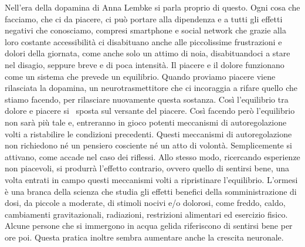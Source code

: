 \documentclass[12pt]{book} %
\begin{document}
\begin{mdframed}[linewidth=1pt]
Nell'era della dopamina di Anna Lembke si parla proprio di questo. Ogni
cosa che facciamo, che ci da piacere, ci può portare alla dipendenza e a tutti gli effetti negativi che conosciamo,
compresi smartphone e social network che grazie alla loro costante accessibilità ci disabituano anche alle piccolissime
frustrazioni e dolori della giornata, come anche solo un attimo di noia, disabituandoci a stare nel disagio, seppure
breve e di poca intensità. Il piacere e il dolore funzionano come un sistema che prevede un equilibrio. Quando proviamo
piacere viene rilasciata la dopamina, un neurotrasmettitore che ci incoraggia a rifare quello che stiamo facendo, per
rilasciare nuovamente questa sostanza. Così l'equilibrio tra dolore e piacere si \ sposta sul
versante del piacere. Così facendo però l'equilibrio non sarà più tale e, entreranno in gioco
potenti meccanismi di autoregolazione volti a ristabilire le condizioni precedenti. Questi meccanismi di
autoregolazione non richiedono né un pensiero cosciente né un atto di volontà. Semplicemente si attivano, come accade
nel caso dei riflessi. Allo stesso modo, ricercando esperienze non piacevoli, si produrrà l'effetto contrario, ovvero
quello di sentirsi bene, una volta entrati in campo questi meccanismi volti a ripristinare
l'equilibrio. L'ormesi è una branca della scienza che studia gli effetti
benefici della somministrazione di dosi, da piccole a moderate, di stimoli nocivi e/o dolorosi, come freddo, caldo,
cambiamenti gravitazionali, radiazioni, restrizioni alimentari ed esercizio fisico. Alcune persone che si immergono in
acqua gelida riferiscono di sentirsi bene per ore poi. Questa pratica inoltre sembra aumentare anche la crescita
neuronale.


\end{mdframed}
\end{document}
